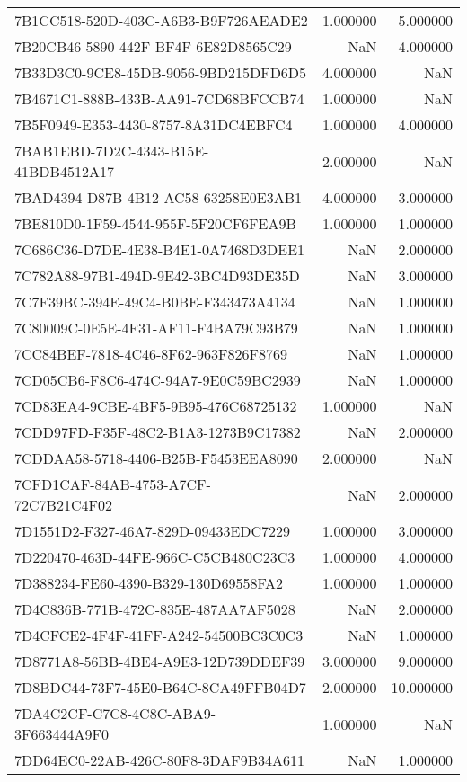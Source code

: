 \begin{tabular}{lrr}
7B1CC518-520D-403C-A6B3-B9F726AEADE2 & 1.000000 & 5.000000 \\
7B20CB46-5890-442F-BF4F-6E82D8565C29 & NaN & 4.000000 \\
7B33D3C0-9CE8-45DB-9056-9BD215DFD6D5 & 4.000000 & NaN \\
7B4671C1-888B-433B-AA91-7CD68BFCCB74 & 1.000000 & NaN \\
7B5F0949-E353-4430-8757-8A31DC4EBFC4 & 1.000000 & 4.000000 \\
7BAB1EBD-7D2C-4343-B15E-41BDB4512A17 & 2.000000 & NaN \\
7BAD4394-D87B-4B12-AC58-63258E0E3AB1 & 4.000000 & 3.000000 \\
7BE810D0-1F59-4544-955F-5F20CF6FEA9B & 1.000000 & 1.000000 \\
7C686C36-D7DE-4E38-B4E1-0A7468D3DEE1 & NaN & 2.000000 \\
7C782A88-97B1-494D-9E42-3BC4D93DE35D & NaN & 3.000000 \\
7C7F39BC-394E-49C4-B0BE-F343473A4134 & NaN & 1.000000 \\
7C80009C-0E5E-4F31-AF11-F4BA79C93B79 & NaN & 1.000000 \\
7CC84BEF-7818-4C46-8F62-963F826F8769 & NaN & 1.000000 \\
7CD05CB6-F8C6-474C-94A7-9E0C59BC2939 & NaN & 1.000000 \\
7CD83EA4-9CBE-4BF5-9B95-476C68725132 & 1.000000 & NaN \\
7CDD97FD-F35F-48C2-B1A3-1273B9C17382 & NaN & 2.000000 \\
7CDDAA58-5718-4406-B25B-F5453EEA8090 & 2.000000 & NaN \\
7CFD1CAF-84AB-4753-A7CF-72C7B21C4F02 & NaN & 2.000000 \\
7D1551D2-F327-46A7-829D-09433EDC7229 & 1.000000 & 3.000000 \\
7D220470-463D-44FE-966C-C5CB480C23C3 & 1.000000 & 4.000000 \\
7D388234-FE60-4390-B329-130D69558FA2 & 1.000000 & 1.000000 \\
7D4C836B-771B-472C-835E-487AA7AF5028 & NaN & 2.000000 \\
7D4CFCE2-4F4F-41FF-A242-54500BC3C0C3 & NaN & 1.000000 \\
7D8771A8-56BB-4BE4-A9E3-12D739DDEF39 & 3.000000 & 9.000000 \\
7D8BDC44-73F7-45E0-B64C-8CA49FFB04D7 & 2.000000 & 10.000000 \\
7DA4C2CF-C7C8-4C8C-ABA9-3F663444A9F0 & 1.000000 & NaN \\
7DD64EC0-22AB-426C-80F8-3DAF9B34A611 & NaN & 1.000000 \\

\end{tabular}
